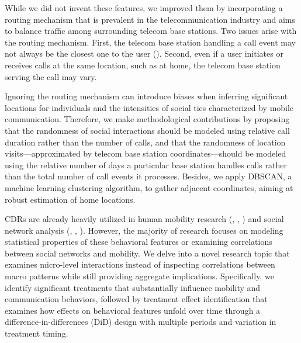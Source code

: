 While we did not invent these features, we improved them by incorporating a routing mechanism that is prevalent in the telecommunication industry and aims to balance traffic among surrounding telecom base stations.
Two issues arise with the routing mechanism.
First, the telecom base station handling a call event may not always be the closest one to the user (\cite{yuan2012correlating}).
Second, even if a user initiates or receives calls at the same location, such as at home, the telecom base station serving the call may vary.

Ignoring the routing mechanism can introduce biases when inferring significant locations for individuals and the intensities of social ties characterized by mobile communication.
Therefore, we make methodological contributions by proposing that the randomness of social interactions should be modeled using relative call duration rather than the number of calls, and that the randomness of location visits---approximated by telecom base station coordinates---should be modeled using the relative number of days a particular base station handles calls rather than the total number of call events it processes. Besides, we apply DBSCAN, a machine learning clustering algorithm, to gather adjacent coordinates, aiming at robust estimation of home locations.

CDRs are already heavily utilized in human mobility research (\cite{gonzalez2008understanding}, \cite{song2010limits}, \cite{wesolowski2016connecting}) and social network analysis (\cite{onnela2007structure}, \cite{cho2011friendship}, \cite{referral_effect_2023aer}).
However, the majority of research focuses on modeling statistical properties of these behavioral features or examining correlations between social networks and mobility.
We delve into a novel research topic that examines micro-level interactions instead of inspecting correlations between macro patterns while still providing aggregate implications. Specifically, we identify significant treatments that substantially influence mobility and communication behaviors, followed by treatment effect identification that examines how effects on behavioral features unfold over time through a difference-in-differences (DiD) design with multiple periods and variation in treatment timing.

